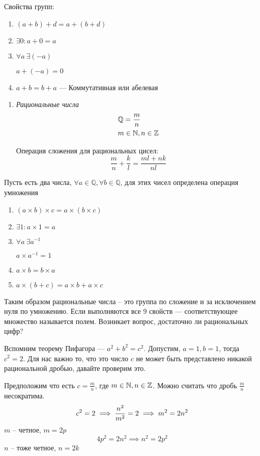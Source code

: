 Свойства групп:
\begin{enumerate}[series=group_properties]
	\item \( (a + b) + d = a + (b + d) \)
	\item \( \exists 0 : a + 0 = a \)
	\item 
	\( \forall a \ \exists (-a) \) 
	
	\( a + (-a) = 0 \)
	\item \( a + b = b + a \) --- Коммутативная или абелевая
\end{enumerate} 
	
\begin{enumerate}[numbers]
	\item \emph{Рациональные числа}
	\begin{align*}
		&\mathbb{Q} = \frac{m}{n} \\
		&m \in \mathbb{N}, n \in \mathbb{Z}
	\end{align*}
	
	Операция сложения для рациональных цисел:
	\[
	\frac{m}{n} + \frac{k}{l} = \frac{ml + nk}{nl}
	\]
\end{enumerate}
	
Пусть есть два числа, \( \forall a \in \mathbb{Q}, \forall b \in \mathbb{Q} \), для этих чисел определена операция умножения
\begin{enumerate}
	\item \( (a \times b) \times c = a \times (b \times c) \)
	\item \( \exists 1 : a \times 1 = a \)
	\item 
	\( \forall a \ \exists a^{-1} \) 
	
	\( a \times a^{-1} = 1 \)
	\item \( a \times b = b \times a \)
	\item \( a \times (b + c) = a \times b + a \times c \)
\end{enumerate}
	
Таким образом рациональные числа -- это группа по сложение и за исключением нуля по умножению. 
Если выполняются все 9 свойств --- соответствующее множество называется полем.
Возникает вопрос, достаточно ли рациональных цифр?

Вспомним теорему Пифагора --- \( a^2 + b^2 = c^2 \). Допустим, \( a = 1, b = 1 \), тогда \( c^2 = 2 \). Для нас важно то, что это число \( c \) не может быть представлено никакой рациональной дробью, давайте проверим это.

Предположим что есть \( c = \frac{m}{n} \), где \( m \in \mathbb{N}, n \in \mathbb{Z} \). Можно считать что дробь \( \frac{m}{n} \) несократима.
\[
	c^2= 2 \implies \frac{n^2}{m^2} = 2 \implies m^2 = 2n^2 \\
\]
\( m \) -- четное, \( m = 2p \)
\[
	4p^2 = 2n^2 \implies n^2 = 2p^2
\]
\( n \) -- тоже четное, \( n = 2k \) \\

